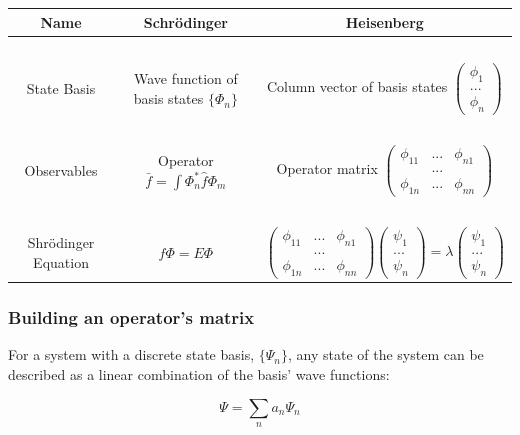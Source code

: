 		\begin{tabular}{c | c | c }
			Name & Schr\"odinger & Heisenberg \\
			\hline
			\hline
			\ &&\\
			
			 State Basis & Wave function of basis states $ \{ \Phi_n \} $ & Column vector of basis states $\begin{pmatrix}\phi_1\\...\\ \phi_n\end{pmatrix}$ \\[3ex]		
			\hline
			\hline
			\ &&\\
			
			Observables & Operator $ \bar{f} = \int \Phi_n^* \hat{f} \Phi_m$ & Operator matrix $\begin{pmatrix}\phi_{11} & ... & \phi_{n1} \\ & ... & \\ \phi_{1n} & ... & \phi_{nn}\end{pmatrix}$ \\[3ex]
			\hline
			\hline
			
			\ &&\\
			Shr\"odinger Equation & $ \hat{f}\Phi =  E \Phi$ & $\begin{pmatrix}\phi_{11} & ... & \phi_{n1} \\ & ... & \\ \phi_{1n} & ... & \phi_{nn}\end{pmatrix} \begin{pmatrix}\psi_1\\...\\ \psi_n\end{pmatrix} = \lambda \begin{pmatrix}\psi_1\\...\\ \psi_n\end{pmatrix}$ \\[3ex]
			\hline
			\hline			
		\end{tabular}
	
		\subsubsection{Building an operator's matrix}
			For a system with a discrete state basis, $\{\Psi_n \}$, any state of the system can be described as a linear combination of the basis' wave functions:
			
			\begin{equation}
				\Psi = \sum_{n}a_n\Psi_n
			\end{equation}
			
